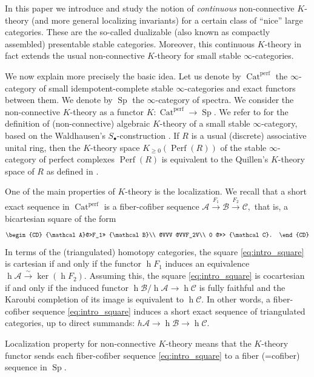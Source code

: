 \documentclass[11pt,leqno]{amsart}
\numberwithin{equation}{section}
\def\h{\operatorname{h}}
\newcommand{\xto}{\xrightarrow}
\newcommand{\Cat}{\operatorname{Cat}}
\newcommand{\cA}{{\mathcal A}}
\newcommand{\cB}{{\mathcal B}}
\newcommand{\cC}{{\mathcal C}}
\newcommand{\Perf}{\operatorname{Perf}}
\newcommand{\perf}{\operatorname{perf}}
\newcommand{\Sp}{\operatorname{Sp}}
\begin{document}
In this paper we introduce and study the notion of {\it continuous} non-connective $K$-theory (and more general localizing invariants) for a certain class of ``nice'' large categories. These are the so-called dualizable (also known as compactly assembled) presentable stable categories. Moreover, this continuous $K$-theory in fact extends the usual non-connective $K$-theory for small stable $\infty$-categories.

We now explain more precisely the basic idea. Let us denote by $\Cat^{\perf}$ the $\infty$-category of small idempotent-complete stable $\infty$-categories and exact functors between them. We denote by $\Sp$ the $\infty$-category of spectra. We consider the non-connective $K$-theory as a functor $K:\Cat^{\perf}\to\Sp.$ We refer to \cite{BGT, Bar} for the definition of (non-connective) algebraic $K$-theory of a small stable $\infty$-category, based on the Waldhausen's $S_{\bullet}$-construction \cite{Wal}. If $R$ is a usual (discrete) associative unital ring, then the $K$-theory space $K_{\geq 0}(\Perf(R))$ of the stable $\infty$-category of perfect complexes $\Perf(R)$ is equivalent to the Quillen's $K$-theory space of $R$ as defined in \cite{Qui}.        

One of the main properties of $K$-theory is the localization. We recall that a short exact sequence in $\Cat^{\perf}$ is a fiber-cofiber sequence $\cA\xto{F_1}\cB\xto{F_2}\cC,$ that is, a bicartesian square of the form
\begin{equation}\label{eq:intro_square}\begin{CD}
\cA @>F_1>> \cB\\
@VVV @VVF_2V\\
0 @>>> \cC.
\end{CD}\end{equation} 
In terms of the (triangulated) homotopy categories, the square \eqref{eq:intro_square} is cartesian  if and only if the functor $\h F_1$ induces an equivalence $\h\cA\xto{\sim}\ker(\h F_2).$ Assuming this, the square \eqref{eq:intro_square} is cocartesian if and only if the induced functor $\h\cB/\h\cA\to \h\cC$ is fully faithful and the Karoubi completion of its image is equivalent to $\h\cC.$ In other words, a fiber-cofiber sequence \eqref{eq:intro_square} induces a short exact sequence of triangulated categories, up to direct summands: $h\cA\to \h\cB\to\h\cC.$

Localization property for non-connective $K$-theory means that the $K$-theory functor sends each fiber-cofiber sequence \eqref{eq:intro_square} to a fiber (=cofiber) sequence in $\Sp.$
\end{document}

